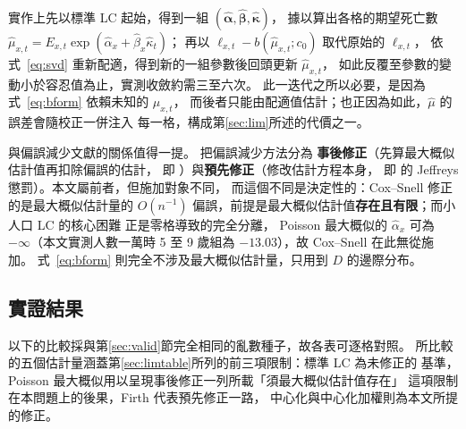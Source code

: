 \documentclass[UTF8, fontset=macnew, a4paper, 12pt]{ctexart}
\begin{document}
實作上先以標準 LC 起始，得到一組
$(\hat{\boldsymbol\alpha},\hat{\boldsymbol\beta},\hat{\boldsymbol\kappa})$，
據以算出各格的期望死亡數
$\hat\mu_{x,t}=E_{x,t}\exp(\hat\alpha_x+\hat\beta_x\hat\kappa_t)$；
再以 $\ell_{x,t}-b(\hat\mu_{x,t};c_0)$ 取代原始的 $\ell_{x,t}$，
依式~\eqref{eq:svd} 重新配適，得到新的一組參數後回頭更新 $\hat\mu_{x,t}$，
如此反覆至參數的變動小於容忍值為止，實測收斂約需三至六次。
此一迭代之所以必要，是因為式~\eqref{eq:bform} 依賴未知的 $\mu_{x,t}$，
而後者只能由配適值估計；也正因為如此，$\hat\mu$ 的誤差會隨校正一併注入
每一格，構成第\ref{sec:lim}所述的代價之一。

與偏誤減少文獻的關係值得一提。\citet{firth1993} 把偏誤減少方法分為
\textbf{事後修正}（先算最大概似估計值再扣除偏誤的估計，
即 \citealp{coxsnell1968}）與\textbf{預先修正}（修改估計方程本身，
即 \citealp{firth1993} 的 Jeffreys 懲罰）。本文屬前者，但施加對象不同，
而這個不同是決定性的：Cox--Snell 修正的是最大概似估計量的 $O(n^{-1})$
偏誤，前提是最大概似估計值\textbf{存在且有限}；而小人口 LC 的核心困難
正是零格導致的完全分離\citep{albert1984}，
Poisson 最大概似的 $\hat\alpha_x$ 可為 $-\infty$（本文實測人數一萬時
5 至 9 歲組為 $-13.03$），故 Cox--Snell 在此無從施加。
式~\eqref{eq:bform} 則完全不涉及最大概似估計量，只用到 $D$ 的邊際分布。

\subsection{實證結果}

以下的比較採與第\ref{sec:valid}節完全相同的亂數種子，故各表可逐格對照。
所比較的五個估計量涵蓋第\ref{sec:limtable}所列的前三項限制：標準 LC 為未修正的
基準， Poisson 最大概似用以呈現事後修正一列所載「須最大概似估計值存在」
這項限制在本問題上的後果，Firth 代表預先修正一路，
中心化與中心化加權則為本文所提的修正。
\end{document}

